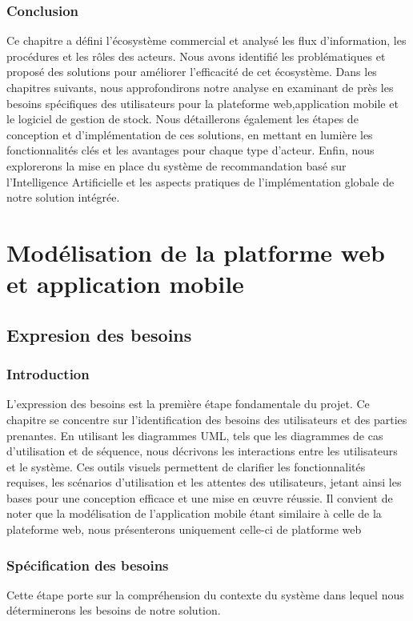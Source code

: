 \documentclass[edit,12pt,a4paper,ChapStyle,oneside,doubleinterligne]{report}
\begin{document}
\section{Conclusion}
Ce chapitre a défini l'écosystème commercial et analysé les flux d'information, les procédures et les rôles des acteurs. Nous avons identifié les problématiques et proposé des solutions pour améliorer l'efficacité de cet écosystème. Dans les chapitres suivants, nous approfondirons notre analyse en examinant de près les besoins spécifiques des utilisateurs pour la plateforme web,application mobile et le logiciel de gestion de stock. Nous détaillerons également les étapes de conception et d'implémentation de ces solutions, en mettant en lumière les fonctionnalités clés et les avantages pour chaque type d'acteur. Enfin, nous explorerons la mise en place du système de recommandation basé sur l'Intelligence Artificielle et les aspects pratiques de l'implémentation globale de notre solution intégrée.




\part{Modélisation de la platforme web et application mobile}
\chapter{Expresion des besoins}  
\newpage
\section{Introduction }
L'expression des besoins est la première étape fondamentale du projet. Ce chapitre se concentre sur l'identification des besoins des utilisateurs et des parties prenantes. En utilisant les diagrammes UML, tels que les diagrammes de cas d'utilisation et de séquence, nous décrivons les interactions entre les utilisateurs et le système. Ces outils visuels permettent de clarifier les fonctionnalités requises, les scénarios d'utilisation et les attentes des utilisateurs, jetant ainsi les bases pour une conception efficace et une mise en œuvre réussie. Il convient de noter que la modélisation de l'application mobile étant similaire à celle de la plateforme web, nous présenterons uniquement celle-ci de platforme web
\section{Spécification des besoins}
Cette étape porte sur la compréhension du contexte du système dans lequel nous déterminerons les besoins de notre solution.
\end{document}
